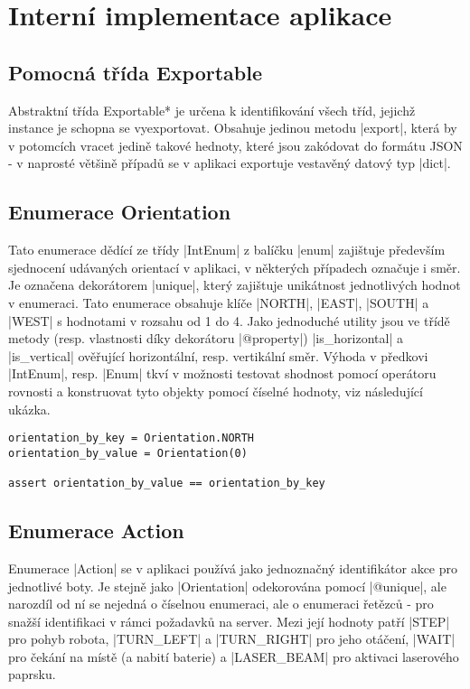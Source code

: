 \section{Interní implementace aplikace}
\label{sec:implementation}

\subsection{Pomocná třída Exportable}

Abstraktní třída \ic*Exportable* je určena k identifikování všech tříd, jejichž instance je schopna se vyexportovat. Obsahuje jedinou metodu \ic|export|, která by v potomcích vracet jedině takové hednoty, které jsou zakódovat do formátu JSON - v naprosté většině případů se v aplikaci exportuje vestavěný datový typ \ic|dict|.

\subsection{Enumerace Orientation}

Tato enumerace dědící ze třídy \ic|IntEnum| z balíčku \ic|enum| zajištuje především sjednocení udávaných orientací v aplikaci, v některých případech označuje i směr. Je označena dekorátorem \ic|unique|, který zajištuje unikátnost jednotlivých hodnot v enumeraci. Tato enumerace obsahuje klíče \ic|NORTH|, \ic|EAST|, \ic|SOUTH| a \ic|WEST| s hodnotami v rozsahu od 1 do 4. Jako jednoduché utility jsou ve třídě metody (resp. vlastnosti díky dekorátoru \ic|@property|) \ic|is_horizontal| a \ic|is_vertical| ověřující horizontální, resp. vertikální směr. Výhoda v předkovi \ic|IntEnum|, resp. \ic|Enum| tkví v možnosti testovat shodnost pomocí operátoru rovnosti a konstruovat tyto objekty pomocí číselné hodnoty, viz následující ukázka.

\begin{lstlisting}[caption={Výhody třídy Enum}]
orientation_by_key = Orientation.NORTH
orientation_by_value = Orientation(0)

assert orientation_by_value == orientation_by_key
\end{lstlisting}

\subsection{Enumerace Action}

Enumerace \ic|Action| se v aplikaci používá jako jednoznačný identifikátor akce pro jednotlivé boty. Je stejně jako \ic|Orientation| odekorována pomocí \ic|@unique|, ale narozdíl od ní se nejedná o číselnou enumeraci, ale o enumeraci řetězců - pro snažší identifikaci v rámci požadavků na server.
Mezi její hodnoty patří \ic|STEP| pro pohyb robota, \ic|TURN_LEFT| a \ic|TURN_RIGHT| pro jeho otáčení, \ic|WAIT| pro čekání na místě (a nabití baterie) a \ic|LASER_BEAM| pro aktivaci laserového paprsku.

